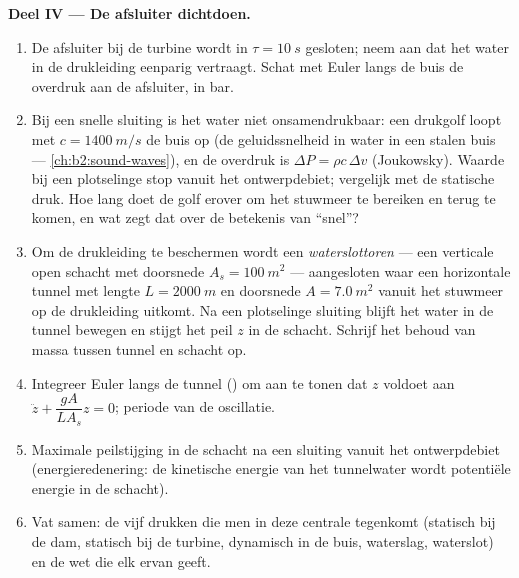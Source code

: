 \begin{problem}
\medskip
\noindent\textbf{Deel IV --- De afsluiter dichtdoen.}
\begin{enumerate}[resume]
  \item De afsluiter bij de turbine wordt in $\tau = \qty{10}{s}$ gesloten;
        neem aan dat het water in de drukleiding eenparig vertraagt. Schat
        met Euler langs de buis de overdruk aan de afsluiter, in bar.
  \item Bij een snelle sluiting is het water niet onsamendrukbaar: een
        drukgolf loopt met $c = \qty{1400}{m/s}$ de buis op (de
        geluidssnelheid in water in een stalen buis ---
        \cref{ch:b2:sound-waves}), en de overdruk is
        $\Delta P = \rho c\,\Delta v$ (Joukowsky). Waarde bij een
        plotselinge stop vanuit het ontwerpdebiet; vergelijk met de
        statische druk. Hoe lang doet de golf erover om het stuwmeer te
        bereiken en terug te komen, en wat zegt dat over de betekenis van
        ``snel''?
  \item Om de drukleiding te beschermen wordt een \emph{waterslottoren} ---
        een verticale open schacht met doorsnede $A_s = \qty{100}{m^2}$ ---
        aangesloten waar een horizontale tunnel met lengte
        $L = \qty{2000}{m}$ en doorsnede $A =
        \qty{7.0}{m^2}$ vanuit het
        stuwmeer op de drukleiding uitkomt. Na een plotselinge sluiting
        blijft het water in de tunnel bewegen en stijgt het peil $z$ in de
        schacht. Schrijf het behoud van massa tussen tunnel en schacht op.
  \item Integreer Euler langs de tunnel () om aan te tonen
        dat $z$ voldoet aan $\ddot z + \dfrac{gA}{LA_s}z = 0$; periode van
        de oscillatie.
  \item Maximale peilstijging in de schacht na een sluiting vanuit het
        ontwerpdebiet (energieredenering: de kinetische energie van het
        tunnelwater wordt potentiële energie in de schacht).
  \item Vat samen: de vijf drukken die men in deze centrale tegenkomt
        (statisch bij de dam, statisch bij de turbine, dynamisch in de buis,
        waterslag, waterslot) en de wet die elk ervan geeft.
\end{enumerate}
\end{problem}
